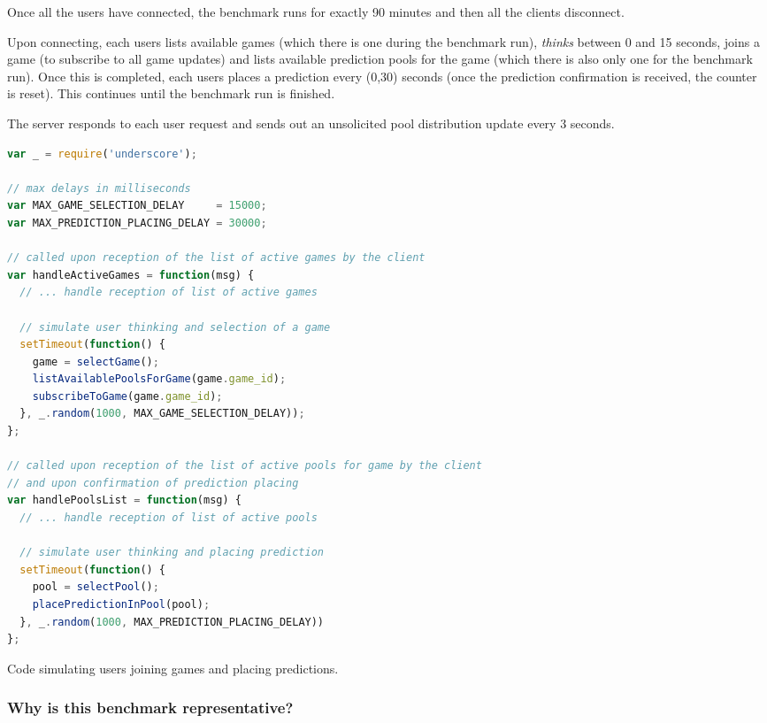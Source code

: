 \documentclass{uvamscse}
\begin{document}
Once all the users have connected, the benchmark runs for exactly 90 minutes and then all the clients disconnect.

Upon connecting, each users lists available games (which there is one during the benchmark run), \textit{thinks} between 0 and 15 seconds, joins a game (to subscribe to all game updates) and lists available prediction pools for the game (which there is also only one for the benchmark run). Once this is completed, each users places a prediction every (0,30) seconds (once the prediction confirmation is received, the counter is reset). This continues until the benchmark run is finished.

The server responds to each user request and sends out an unsolicited pool distribution update every 3 seconds.

\begin{sourcecode}
\begin{lstlisting}[language=javascript]
var _ = require('underscore');

// max delays in milliseconds
var MAX_GAME_SELECTION_DELAY     = 15000;
var MAX_PREDICTION_PLACING_DELAY = 30000;

// called upon reception of the list of active games by the client
var handleActiveGames = function(msg) {
  // ... handle reception of list of active games

  // simulate user thinking and selection of a game
  setTimeout(function() {
    game = selectGame();
    listAvailablePoolsForGame(game.game_id);
    subscribeToGame(game.game_id);
  }, _.random(1000, MAX_GAME_SELECTION_DELAY));
};

// called upon reception of the list of active pools for game by the client
// and upon confirmation of prediction placing
var handlePoolsList = function(msg) {
  // ... handle reception of list of active pools

  // simulate user thinking and placing prediction
  setTimeout(function() {
    pool = selectPool();
    placePredictionInPool(pool);
  }, _.random(1000, MAX_PREDICTION_PLACING_DELAY))
};

\end{lstlisting}
\caption{Code simulating users joining games and placing predictions.}
\end{sourcecode}

\subsubsection{Why is this benchmark representative?}
\end{document}
